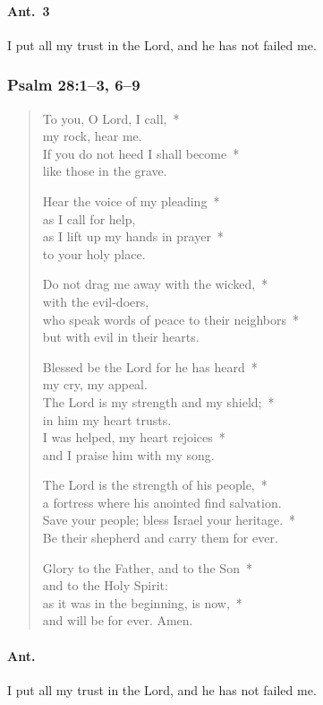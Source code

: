 \documentclass[12pt,twocolumn,letterpaper]{book}
\begin{document}
\paragraph{Ant.\ 3}{I put all my trust in the Lord, and he has not failed me.}

\subsubsection*{Psalm 28:1--3, 6--9}

\begin{verse}
To you, O Lord, I call,~*\\
my rock, hear me.\\
If you do not heed I shall become~*\\
like those in the grave.

Hear the voice of my pleading~*\\
as I call for help,\\
as I lift up my hands in prayer~*\\
to your holy place.

Do not drag me away with the wicked,~*\\
with the evil-doers,\\
who speak words of peace to their neighbors~*\\
but with evil in their hearts.

Blessed be the Lord for he has heard~*\\
my cry, my appeal.\\
The Lord is my strength and my shield;~*\\
in him my heart trusts.\\
I was helped, my heart rejoices~*\\
and I praise him with my song.

The Lord is the strength of his people,~*\\
a fortress where his anointed find salvation.\\
Save your people; bless Israel your heritage.~*\\
Be their shepherd and carry them for ever.

Glory to the Father, and to the Son~*\\
and to the Holy Spirit:\\
as it was in the beginning, is now,~*\\
and will be for ever. Amen.
\end{verse}

\paragraph{Ant.}{I put all my trust in the Lord, and he has not failed me.}
\end{document}
